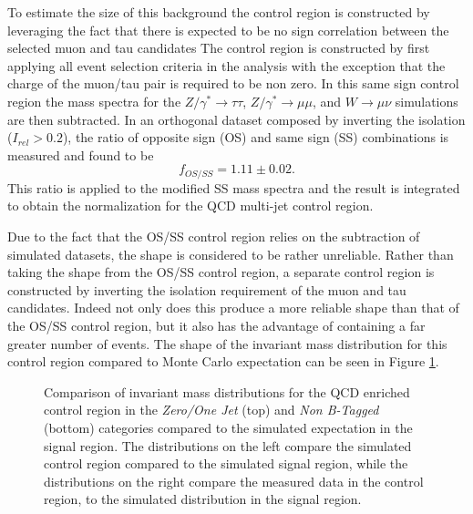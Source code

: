 To estimate the size of this background the control region is constructed by leveraging the fact that there is expected to be no sign correlation between the selected muon and tau candidates
The control region is constructed by first applying all event selection criteria in the analysis with the exception that the charge of the muon/tau pair is required to be non zero.
In this same sign control region the mass spectra for the $Z/\gamma^{*} \rightarrow \tau\tau$, $Z/\gamma^{*} \rightarrow \mu\mu$, and $W\rightarrow\mu\nu$ simulations are then subtracted.
In an orthogonal dataset composed by inverting the isolation ($I_{rel} > 0.2$), the ratio of opposite sign (OS) and same sign (SS) combinations is measured and found to be
\begin{equation}
f_{OS/SS} = 1.11 \pm 0.02.
\end{equation}
This ratio is applied to the modified SS mass spectra and the result is integrated to obtain the normalization for the QCD multi-jet control region.

Due to the fact that the OS/SS control region relies on the subtraction of simulated datasets, the shape is considered to be rather unreliable.
Rather than taking the shape from the OS/SS control region, a separate control region is constructed by inverting the isolation requirement of the muon and tau candidates.
Indeed not only does this produce a more reliable shape than that of the OS/SS control region, but it also has the advantage of containing a far greater number of events.
The shape of the invariant mass distribution for this control region compared to Monte Carlo expectation can be seen in Figure \ref{fig:qcdenriched}.

\begin{figure}[ht]
\centering
{}

\caption{
  Comparison of invariant mass distributions for the QCD enriched control region in the \emph{Zero/One Jet} (top) and \emph{Non B-Tagged} (bottom) categories compared to the simulated expectation in the signal region. 
  The distributions on the left compare the simulated control region compared to the simulated signal region, while the distributions on the right compare the measured data in the control region, to the simulated distribution in the signal region.
}
\label{fig:qcdenriched}
\end{figure}


